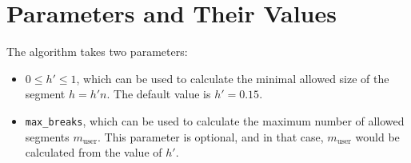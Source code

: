 \documentclass[main.tex]{subfiles}
\begin{document}
\section{Parameters and Their Values}
\label{sec:breakpoints_params}
The algorithm takes two parameters:
\begin{itemize}
\item  $0\leq h' \leq 1$, which can be used to calculate the minimal allowed size of the segment
  $h = h' n$. The default value is $h' = 0.15$.
\item \texttt{max\_breaks}, which can be used to calculate the maximum number of allowed segments
  $m_{\text{user}}$. This parameter is optional, and in that case, $m_{\text{user}}$ would be calculated
  from the value of $h'$.
\end{itemize}



\biblio
\end{document}
